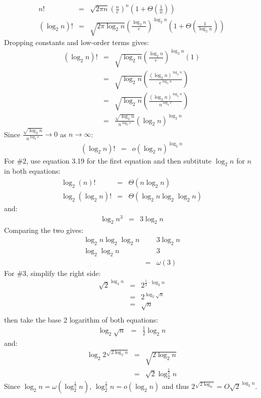 \begin{eqnarray*}
	n! &=& \sqrt{2 \pi n} \left ( \frac{n}{e} \right )^n \left ( 1 + \Theta \left ( \frac{1}{n} \right ) \right ) \\
	(\log_2 n)! &=& \sqrt{2 \pi \log_2 n} \left ( \frac{\log_2 n}{e} \right )^{\log_2 n} \left ( 1 + \Theta \left ( \frac{1}{\log_2 n} \right ) \right )
\end{eqnarray*}
Dropping constants and low-order terms gives:
\begin{eqnarray*}
	(\log_2 n)! &=& \sqrt{\log_2 n} \left ( \frac{\log_2 n}{e} \right )^{\log_2 n} (1) \\
	&=& \sqrt{\log_2 n} \left ( \frac{(\log_2 n)^{\log_2 n}}{e^{\log_2 n}} \right ) \\
	&=& \sqrt{\log_2 n} \left ( \frac{(\log_2 n)^{\log_2 n}}{n^{\log_2 e}} \right ) \\
	&=& \frac{\sqrt{\log_2 n}}{n^{\log_2 e}} ( \log_2 n )^{\log_2 n}
\end{eqnarray*}
Since $\frac{\sqrt{\log_2 n}}{n^{\log_2 e}} \rightarrow 0$ as $n \rightarrow \infty$:
\begin{eqnarray*}
	(\log_2 n)! &=& o(\log_2 n)^{\log_2 n}
\end{eqnarray*}
For \#2, use equation 3.19 for the first equation and then subtitute $\log_2 n$ for $n$ in both equations:
\begin{eqnarray*}
	\log_2 (n)! & = & \Theta (n \log_2 n) \\
	\log_2 (\log_2 n)! & = & \Theta (\log_2 n \log_2 \log_2 n)
\end{eqnarray*}
and:
\begin{eqnarray*}
	\log_2 n^3 & = & 3 \log_2 n
\end{eqnarray*}
Comparing the two gives:
\begin{eqnarray*}
	\log_2 n \log_2 \log_2 n &   & 3 \log_2 n \\
	\log_2 \log_2 n &   & 3 \\
	& = & \omega(3)
\end{eqnarray*}
For \#3, simplify the right side:
\begin{eqnarray*}
	\sqrt{2}^{\log_2 n} & = & 2^{\frac{1}{2} \cdot \log_2 n} \\
	& = & 2^{\log_2 \sqrt{n}} \\
	& = & \sqrt{n} \\
\end{eqnarray*}
then take the base 2 logarithm of both equations:
\begin{eqnarray*}
	\log_2 \sqrt{n} & = & \frac{1}{2} \log_2 n
\end{eqnarray*}
and:
\begin{eqnarray*}
	\log_2 2^{\sqrt{2 \log_2 n}} & = & \sqrt{2 \log_2 n} \\
	& = & \sqrt{2} \log_2^{\frac{1}{2}} n
\end{eqnarray*}
Since $\log_2 n = \omega (\log_2^{\frac{1}{2}} n)$, $\log_2^{\frac{1}{2}} n = o(\log_2n)$ and thus $2^{\sqrt{2 \log_n}} = O \sqrt{2}^{\log_2 n}$.

